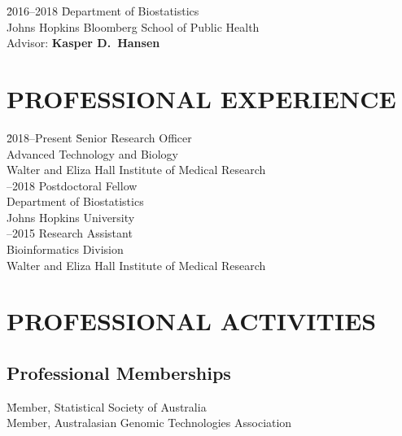 \documentclass[11pt,letterpaper,pdf]{article}
\begin{document}
\begin{tabbing}
  \= 2016--2018 \hspace*{0.5cm} \= Department of Biostatistics \\
  \>\> Johns Hopkins Bloomberg School of Public Health\\
  \>\> Advisor: {\bf Kasper D.\ Hansen}
\end{tabbing}

\section*{PROFESSIONAL EXPERIENCE}

\begin{tabbing}
  \= 2018--Present \= Senior Research Officer\\
  \>\>Advanced Technology and Biology\\
  \>\>Walter and Eliza Hall Institute of Medical Research\\
  --2018 \> Postdoctoral Fellow\\
  \>\>Department of Biostatistics\\
  \>\> Johns Hopkins University \\
  --2015 \> Research Assistant\\
  \>\>Bioinformatics Division\\
  \>\> Walter and Eliza Hall Institute of Medical Research
\end{tabbing}

\section*{PROFESSIONAL ACTIVITIES}

\subsection*{Professional Memberships}

\begin{tabbing}
  \= Member, Statistical Society of Australia\\
  \> Member, Australasian Genomic Technologies Association\\
\end{tabbing}


\end{document}
